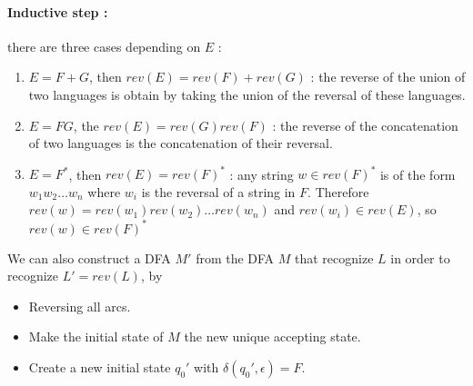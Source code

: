 \documentclass[a4paper,11pt]{report}
\begin{document}
\paragraph{Inductive step :} there are three cases depending on $E$ :

\begin{enumerate}
\item $E = F + G$, then $rev(E) = rev(F) + rev(G)$ : the reverse of the union of
  two languages is obtain by taking the union of the reversal of these languages.
\item $E = FG$, the $rev(E) = rev(G)rev(F)$ : the reverse of the concatenation
  of two languages is the concatenation of their reversal.
\item $E = F^*$, then $rev(E) = rev(F)^*$ : any string $w \in rev(F)^*$ is of
  the form $w_1w_2 \dots w_n$ where $w_i$ is the reversal of a string in $F$.
  Therefore $rev(w) = rev(w_1)rev(w_2)\dots rev(w_n)$ and $rev(w_i) \in rev(E)$,
  so $rev(w) \in rev(F)^*$
\end{enumerate}

We can also construct a DFA $M'$ from the DFA $M$ that recognize $L$ in order to
recognize $L' = rev(L)$, by

\begin{itemize}
\item Reversing all arcs.
\item Make the initial state of $M$ the new unique accepting state.
\item Create a new initial state $q_0'$ with $\delta(q_0',\epsilon) = F$.
\end{itemize}
\end{document}
